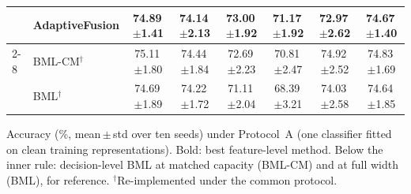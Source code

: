 \begin{table}[!t]
\begin{tabular}{llcccccc}
 & \textbf{AdaptiveFusion} & \textbf{74.89}\,{\scriptsize$\pm$1.41} & \textbf{74.14}\,{\scriptsize$\pm$2.13} & 73.00\,{\scriptsize$\pm$1.92} & 71.17\,{\scriptsize$\pm$1.92} & 72.97\,{\scriptsize$\pm$2.62} & \textbf{74.67}\,{\scriptsize$\pm$1.40} \\
\cmidrule(lr){2-8}
 & BML-CM$^\dagger$ & 75.11\,{\scriptsize$\pm$1.80} & 74.44\,{\scriptsize$\pm$1.84} & 72.69\,{\scriptsize$\pm$2.23} & 70.81\,{\scriptsize$\pm$2.47} & 74.92\,{\scriptsize$\pm$2.52} & 74.83\,{\scriptsize$\pm$1.69} \\
 & BML$^\dagger$ & 74.69\,{\scriptsize$\pm$1.89} & 74.22\,{\scriptsize$\pm$1.72} & 71.11\,{\scriptsize$\pm$2.04} & 68.39\,{\scriptsize$\pm$3.21} & 74.03\,{\scriptsize$\pm$2.58} & 74.64\,{\scriptsize$\pm$1.85} \\
\bottomrule
\end{tabular}
\par\smallskip
\parbox{\linewidth}{\scriptsize Accuracy (\%, mean\,$\pm$\,std over ten seeds) under Protocol~A (one classifier fitted on clean training representations). Bold: best feature-level method. Below the inner rule: decision-level BML at matched capacity (BML-CM) and at full width (BML), for reference. $^\dagger$Re-implemented under the common protocol.}
\end{table}
